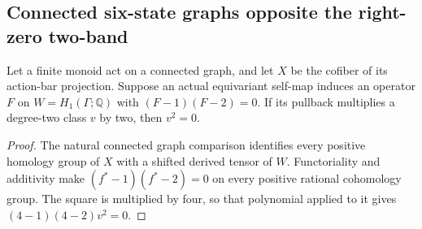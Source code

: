 \subsection{Connected six-state graphs opposite the right-zero two-band}

\begin{lemma}
\label{C:connected-graph-polynomial-square}
Let a finite monoid act on a connected graph, and let $X$ be
the cofiber of its action-bar projection. Suppose an actual
equivariant self-map induces an operator $F$ on
$W=H_1(\Gamma;\mathbb Q)$ with $(F-1)(F-2)=0$.
If its pullback multiplies a degree-two class $v$ by two,
then $v^2=0$.
\end{lemma}
\begin{proof}
The natural connected graph comparison identifies every
positive homology group of $X$ with a shifted derived tensor
of $W$. Functoriality and additivity make
$(f^*-1)(f^*-2)=0$ on every positive rational cohomology
group. The square is multiplied by four, so that polynomial
applied to it gives $(4-1)(4-2)v^2=0$.
\end{proof}


